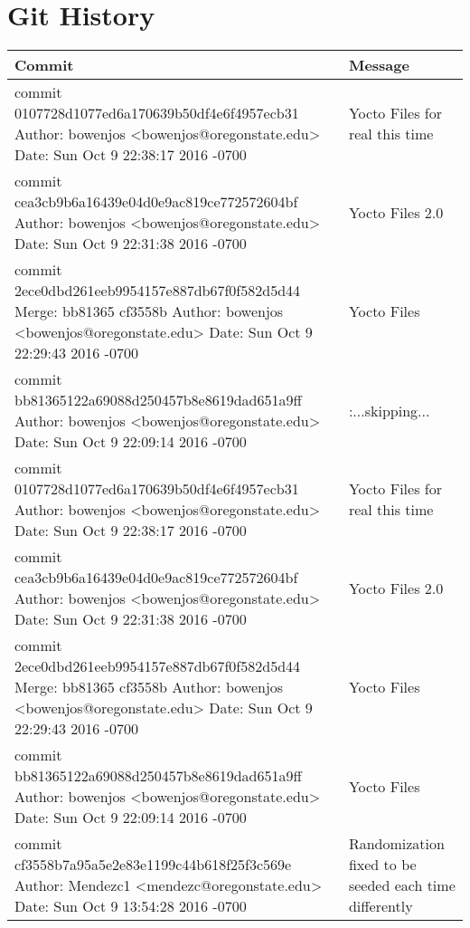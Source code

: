 \documentclass[letterpaper,10pt,titlepage]{article}
\begin{document}
\section {Git History}
\begin{tabular}{ |p{10cm}|p{3cm}| } 
 \hline
Commit & Message \\
\hline
commit 0107728d1077ed6a170639b50df4e6f4957ecb31
Author: bowenjos <bowenjos@oregonstate.edu>
Date:   Sun Oct 9 22:38:17 2016 -0700
&
    Yocto Files for real this time\\
\hline

commit cea3cb9b6a16439e04d0e9ac819ce772572604bf
Author: bowenjos <bowenjos@oregonstate.edu>
Date:   Sun Oct 9 22:31:38 2016 -0700
&
    Yocto Files 2.0\\
\hline

commit 2ece0dbd261eeb9954157e887db67f0f582d5d44
Merge: bb81365 cf3558b
Author: bowenjos <bowenjos@oregonstate.edu>
Date:   Sun Oct 9 22:29:43 2016 -0700
&
    Yocto Files\\
\hline

commit bb81365122a69088d250457b8e8619dad651a9ff
Author: bowenjos <bowenjos@oregonstate.edu>
Date:   Sun Oct 9 22:09:14 2016 -0700
&
:...skipping...\\
\hline

commit 0107728d1077ed6a170639b50df4e6f4957ecb31
Author: bowenjos <bowenjos@oregonstate.edu>
Date:   Sun Oct 9 22:38:17 2016 -0700
&
    Yocto Files for real this time\\
\hline

commit cea3cb9b6a16439e04d0e9ac819ce772572604bf
Author: bowenjos <bowenjos@oregonstate.edu>
Date:   Sun Oct 9 22:31:38 2016 -0700
&
    Yocto Files 2.0\\
\hline

commit 2ece0dbd261eeb9954157e887db67f0f582d5d44
Merge: bb81365 cf3558b
Author: bowenjos <bowenjos@oregonstate.edu>
Date:   Sun Oct 9 22:29:43 2016 -0700
&
    Yocto Files\\
\hline

commit bb81365122a69088d250457b8e8619dad651a9ff
Author: bowenjos <bowenjos@oregonstate.edu>
Date:   Sun Oct 9 22:09:14 2016 -0700
&
    Yocto Files\\
\hline

commit cf3558b7a95a5e2e83e1199c44b618f25f3c569e
Author: Mendezc1 <mendezc@oregonstate.edu>
Date:   Sun Oct 9 13:54:28 2016 -0700
&
    Randomization fixed to be seeded each time differently\\
\hline


\end{tabular}
\end{document}
